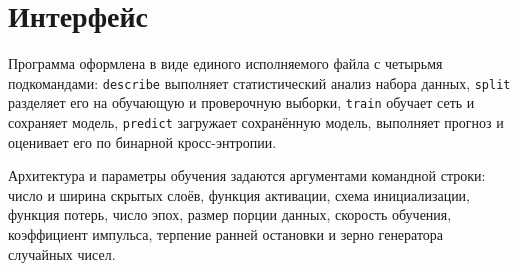 \section{Интерфейс}

Программа оформлена в виде единого исполняемого файла с четырьмя подкомандами:
\texttt{describe} выполняет статистический анализ набора данных, \texttt{split} разделяет
его на обучающую и проверочную выборки, \texttt{train} обучает сеть и сохраняет модель,
\texttt{predict} загружает сохранённую модель, выполняет прогноз и оценивает его по
бинарной кросс-энтропии.

Архитектура и параметры обучения задаются аргументами командной строки: число и ширина
скрытых слоёв, функция активации, схема инициализации, функция потерь, число эпох, размер
порции данных, скорость обучения, коэффициент импульса, терпение ранней остановки и зерно
генератора случайных чисел.
